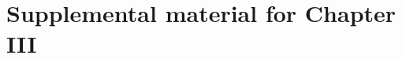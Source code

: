 \appendix
\renewcommand\thefigure{\thechapter.\arabic{figure}}
\renewcommand\thetable{\thechapter.\arabic{table}}
\captionsetup{list=no}

\chapter{Supplemental material for Chapter III}



